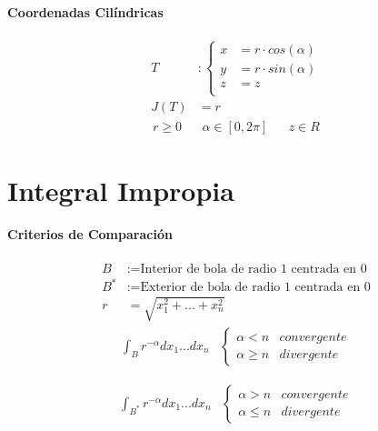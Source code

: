 \documentclass{article}
\begin{document}
\begin{multicols}{2}
      \paragraph{Coordenadas Cilíndricas}

        \begin{align*}
          T &:
          \begin{cases}
            x &= r \cdot cos(\alpha)\\
            y &= r \cdot sin(\alpha)\\
            z &= z \\
          \end{cases} \\
          J(T) &= r
        \end{align*}
        \begin{align*}
          r \geq 0 &&  \alpha \in[0,2\pi] && z \in R
        \end{align*}


    \section{Integral Impropia}

      \paragraph{Criterios de Comparación}
        \begin{align*}
          B &:= \text{Interior de bola de radio 1 centrada en 0} \\
          B^* &:= \text{Exterior de bola de radio 1 centrada en 0} \\
          r &= \sqrt{x_1^2 + ... + x_n^2}
        \end{align*}
        \begin{align*}
          \int_B r^{-\alpha} dx_1...dx_n &
          \begin{cases}
            \alpha < n & convergente\\
            \alpha \geq n & divergente
          \end{cases}
        \end{align*}

        \begin{align*}
          \int_{B^*}r^{-\alpha} dx_1...dx_n &
          \begin{cases}
            \alpha > n & convergente\\
            \alpha \leq n & divergente
          \end{cases}
        \end{align*}



\end{multicols}
\end{document}
